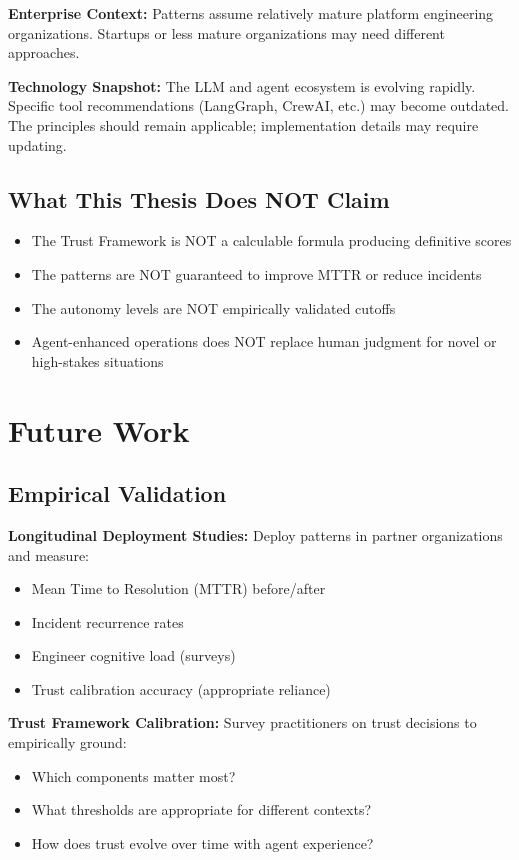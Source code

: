 \textbf{Enterprise Context:}
Patterns assume relatively mature platform engineering organizations. Startups or less mature organizations may need different approaches.

\textbf{Technology Snapshot:}
The LLM and agent ecosystem is evolving rapidly. Specific tool recommendations (LangGraph, CrewAI, etc.) may become outdated. The principles should remain applicable; implementation details may require updating.

\subsection{What This Thesis Does NOT Claim}
\label{subsec:not-claimed}

\begin{itemize}
    \item The Trust Framework is NOT a calculable formula producing definitive scores
    \item The patterns are NOT guaranteed to improve MTTR or reduce incidents
    \item The autonomy levels are NOT empirically validated cutoffs
    \item Agent-enhanced operations does NOT replace human judgment for novel or high-stakes situations
\end{itemize}

\section{Future Work}
\label{sec:future-work}

\subsection{Empirical Validation}
\label{subsec:empirical-validation}

\textbf{Longitudinal Deployment Studies:}
Deploy patterns in partner organizations and measure:
\begin{itemize}
    \item Mean Time to Resolution (MTTR) before/after
    \item Incident recurrence rates
    \item Engineer cognitive load (surveys)
    \item Trust calibration accuracy (appropriate reliance)
\end{itemize}

\textbf{Trust Framework Calibration:}
Survey practitioners on trust decisions to empirically ground:
\begin{itemize}
    \item Which components matter most?
    \item What thresholds are appropriate for different contexts?
    \item How does trust evolve over time with agent experience?
\end{itemize}

